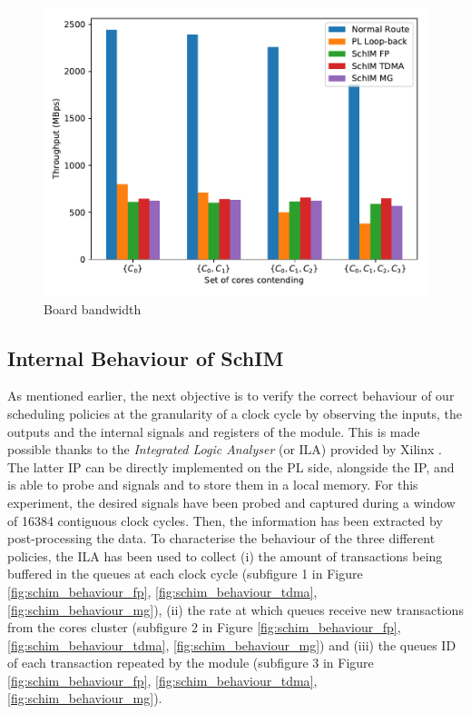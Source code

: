     \begin{figure}
      \centering
      \includegraphics[scale=0.5]{images/bw_comparisons.pdf}
      \caption{Board bandwidth}
      \label{fig:bandwidth_comparison}
    \end{figure}

  \subsection{Internal Behaviour of SchIM}
    \label{subsec:internal-behaviour-of-schim}    
    As mentioned earlier, the next objective is to verify the correct behaviour of our scheduling policies at the granularity of a clock cycle by observing the inputs, the outputs and the internal signals and registers of the \schim module.
    This is made possible thanks to the \emph{Integrated Logic Analyser} (or ILA) provided by Xilinx \cite{Xilinx-ILA}. The latter IP can be directly implemented on the PL side, alongside the \schim IP, and is able to probe and signals and to store them in a local memory. For this experiment, the desired signals have been probed and captured during a window of 16384 contiguous clock cycles. Then, the information has been extracted by post-processing the data.
    To characterise the behaviour of the three different policies, the ILA has been used to collect (i) the amount of transactions being buffered in the queues at each clock cycle (subfigure 1 in Figure \ref{fig:schim_behaviour_fp}, \ref{fig:schim_behaviour_tdma}, \ref{fig:schim_behaviour_mg}), (ii) the rate at which queues receive new transactions from the cores cluster (subfigure 2 in Figure \ref{fig:schim_behaviour_fp}, \ref{fig:schim_behaviour_tdma}, \ref{fig:schim_behaviour_mg}) and (iii) the queues ID of each transaction repeated by the \schim module (subfigure 3 in Figure \ref{fig:schim_behaviour_fp}, \ref{fig:schim_behaviour_tdma}, \ref{fig:schim_behaviour_mg}).
    

